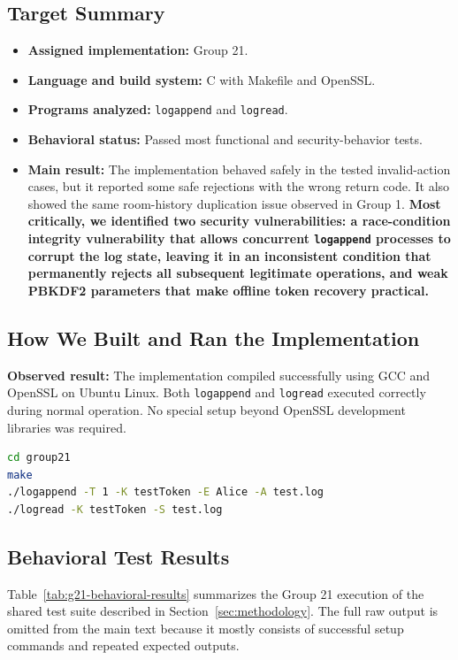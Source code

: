 \documentclass[a4paper, 12pt]{article}
\begin{document}
    \subsection{Target Summary}
    \begin{itemize}
        \item \textbf{Assigned implementation:} Group 21.
        \item \textbf{Language and build system:} C with Makefile and OpenSSL.
        \item \textbf{Programs analyzed:} \texttt{logappend} and \texttt{logread}.
        \item \textbf{Behavioral status:} Passed most functional and security-behavior tests.
        \item \textbf{Main result:} The implementation behaved safely in the tested invalid-action cases, but it reported some safe rejections with the wrong return code. It also showed the same room-history duplication issue observed in Group 1. \textbf{Most critically, we identified two security vulnerabilities: a race-condition integrity vulnerability that allows concurrent \texttt{logappend} processes to corrupt the log state, leaving it in an inconsistent condition that permanently rejects all subsequent legitimate operations, and weak PBKDF2 parameters that make offline token recovery practical.}
    \end{itemize}

    \subsection{How We Built and Ran the Implementation}
    \noindent\textbf{Observed result:} The implementation compiled successfully using GCC and OpenSSL on Ubuntu Linux. Both \texttt{logappend} and \texttt{logread} executed correctly during normal operation. No special setup beyond OpenSSL development libraries was required.

    \begin{lstlisting}[language=bash]
cd group21
make
./logappend -T 1 -K testToken -E Alice -A test.log
./logread -K testToken -S test.log
    \end{lstlisting}

    \subsection{Behavioral Test Results}
    Table~\ref{tab:g21-behavioral-results} summarizes the Group 21 execution of the shared test suite described in Section~\ref{sec:methodology}. The full raw output is omitted from the main text because it mostly consists of successful setup commands and repeated expected outputs.
\end{document}
